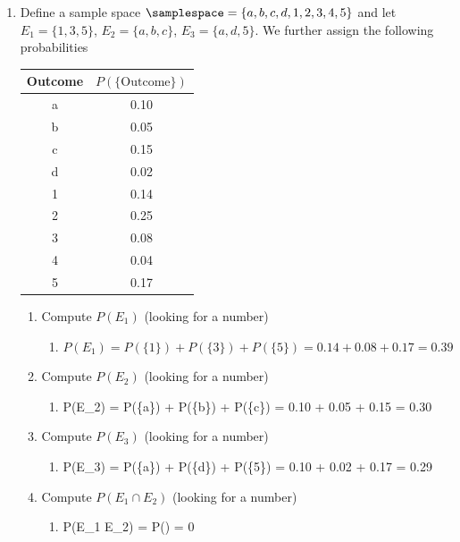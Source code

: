 \documentclass[krantz1,ChapterTOCs]{krantz}
\begin{document}
\begin{enumerate}
\begin{enumerate}
   \end{enumerate}
   \item Define a sample space $\samplespace = \{ a,b,c,d,1,2,3,4,5 \}$ and let $E_{1} = \{1,3,5\}$, $E_{2} = \{a,b,c\}$, $E_{3} = \{ a,d,5 \}$. We further assign the following probabilities 
   \begin{table}[ht!]
       \centering
       \begin{tabular}{ c c}
       Outcome &  $P(\{\text{Outcome}\})$\\
       \hline
            a & 0.10  \\
            b & 0.05 \\
            c & 0.15 \\
            d & 0.02 \\
            1 & 0.14 \\
            2 & 0.25 \\
            3 & 0.08 \\
            4 & 0.04 \\
            5 & 0.17
       \end{tabular}
   \end{table}
   \begin{enumerate}
       \item Compute $P(E_{1})$ (looking for a number)
       \begin{enumerate}
           \item {\color{red} $P(E_{1}) = P(\{1\}) + P(\{3\}) + P(\{5\}) = 0.14 + 0.08 + 0.17 = 0.39$  }
       \end{enumerate}
       \item Compute $P(E_{2})$ (looking for a number)
       \begin{enumerate}
           \item {\color{red}  P(E_{2}) = P(\{a\}) + P(\{b\}) + P(\{c\}) = 0.10 + 0.05 + 0.15 = 0.30 }
       \end{enumerate}
       \item Compute $P(E_{3})$ (looking for a number)
       \begin{enumerate}
           \item {\color{red}  P(E_{3}) = P(\{a\}) + P(\{d\}) + P(\{5\}) = 0.10 + 0.02 + 0.17 = 0.29 }
       \end{enumerate}
       \item Compute $P(E_{1} \cap E_{2})$ (looking for a number)
       \begin{enumerate}
           \item {\color{red} P(E_{1} \cap E_{2}) = P(\emptyset) = 0  }

\end{enumerate}
\end{enumerate}
\end{enumerate}
\end{document}
